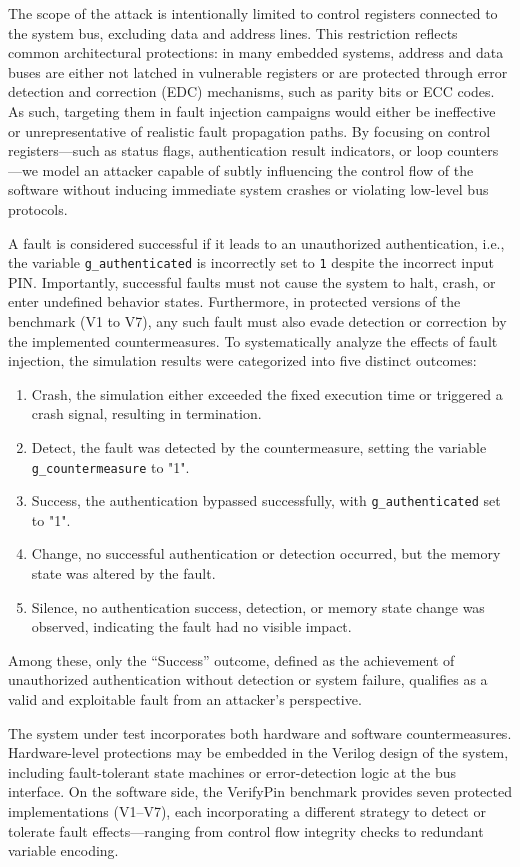 The scope of the attack is intentionally limited to control registers connected to the system bus, excluding data and address lines. This restriction reflects common architectural protections: in many embedded systems, address and data buses are either not latched in vulnerable registers or are protected through error detection and correction (EDC) mechanisms, such as parity bits or ECC codes. As such, targeting them in fault injection campaigns would either be ineffective or unrepresentative of realistic fault propagation paths. By focusing on control registers—such as status flags, authentication result indicators, or loop counters—we model an attacker capable of subtly influencing the control flow of the software without inducing immediate system crashes or violating low-level bus protocols.

A fault is considered successful if it leads to an unauthorized authentication, i.e., the variable \texttt{g\_authenticated} is incorrectly set to \texttt{1} despite the incorrect input PIN. Importantly, successful faults must not cause the system to halt, crash, or enter undefined behavior states. Furthermore, in protected versions of the benchmark (V1 to V7), any such fault must also evade detection or correction by the implemented countermeasures. To systematically analyze the effects of fault injection, the simulation results were categorized into five distinct outcomes:
\begin{enumerate}
\item Crash, the simulation either exceeded the fixed execution time or triggered a crash signal, resulting in termination.
\item Detect, the fault was detected by the countermeasure, setting the variable \texttt{g\_countermeasure} to "1".
\item Success, the authentication bypassed successfully, with \texttt{g\_authenticated} set to "1".
\item Change, no successful authentication or detection occurred, but the memory state was altered by the fault.
\item Silence, no authentication success, detection, or memory state change was observed, indicating the fault had no visible impact.
\end{enumerate}
Among these, only the “Success” outcome, defined as the achievement of unauthorized authentication without detection or system failure, qualifies as a valid and exploitable fault from an attacker’s perspective.

The system under test incorporates both hardware and software countermeasures. Hardware-level protections may be embedded in the Verilog design of the system, including fault-tolerant state machines or error-detection logic at the bus interface. On the software side, the VerifyPin benchmark provides seven protected implementations (V1–V7), each incorporating a different strategy to detect or tolerate fault effects—ranging from control flow integrity checks to redundant variable encoding.

